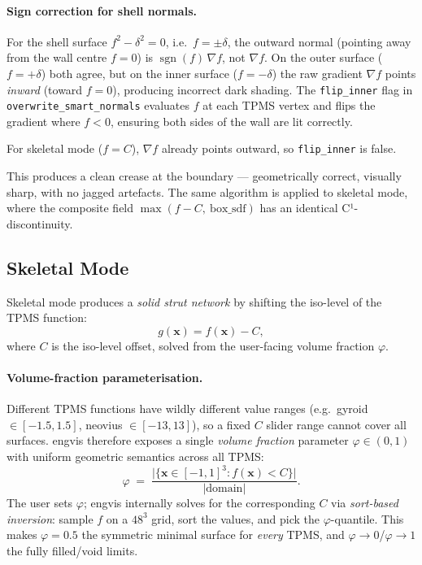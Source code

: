 \documentclass[11pt]{article}
\begin{document}
\paragraph{Sign correction for shell normals.}
For the shell surface $f^2 - \delta^2 = 0$, i.e.\ $f = \pm\delta$,
the outward normal (pointing away from the wall centre $f=0$) is
$\operatorname{sgn}(f)\,\nabla f$, not $\nabla f$.  On the outer
surface ($f = +\delta$) both agree, but on the inner surface
($f = -\delta$) the raw gradient $\nabla f$ points \emph{inward}
(toward $f=0$), producing incorrect dark shading.  The
\texttt{flip\_inner} flag in \texttt{overwrite\_smart\_normals}
evaluates $f$ at each TPMS vertex and flips the gradient where
$f < 0$, ensuring both sides of the wall are lit correctly.

For skeletal mode ($f = C$), $\nabla f$ already points outward, so
\texttt{flip\_inner} is false.

This produces a clean crease at the boundary --- geometrically correct,
visually sharp, with no jagged artefacts.  The same algorithm is
applied to skeletal mode, where the composite field
$\max(f-C,\ \text{box\_sdf})$ has an identical C¹-discontinuity.

\subsection{Skeletal Mode}\label{sec:skeletal}

Skeletal mode produces a \emph{solid strut network} by shifting the
iso-level of the TPMS function:
\begin{equation}\label{eq:skeletal}
  g(\mathbf{x}) = f(\mathbf{x}) - C,
\end{equation}
where $C$ is the iso-level offset, solved from the user-facing volume
fraction $\varphi$.

\paragraph{Volume-fraction parameterisation.}\label{sec:vol-frac}
Different TPMS functions have wildly different value ranges
(e.g.\ gyroid $\in[-1.5,1.5]$, neovius $\in[-13,13]$), so a fixed
$C$ slider range cannot cover all surfaces.  engvis therefore exposes
a single \emph{volume fraction} parameter $\varphi\in(0,1)$ with
uniform geometric semantics across all TPMS:
\begin{equation}\label{eq:vol-frac}
  \varphi \;=\; \frac{\bigl|\{\mathbf{x}\in[-1,1]^3 : f(\mathbf{x}) < C\}\bigr|}
                     {|\text{domain}|}.
\end{equation}
The user sets $\varphi$; engvis internally solves for the
corresponding $C$ via \emph{sort-based inversion}: sample $f$ on a
$48^3$ grid, sort the values, and pick the $\varphi$-quantile.  This
makes $\varphi=0.5$ the symmetric minimal surface for \emph{every}
TPMS, and $\varphi\to0$/$\varphi\to1$ the fully filled/void limits.
\end{document}
